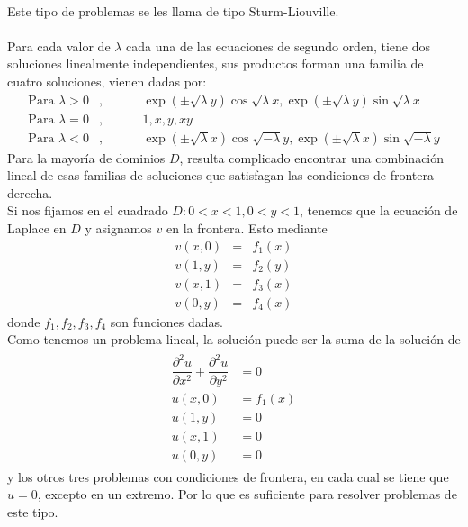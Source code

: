 \\
Este tipo de problemas se les llama de tipo Sturm-Liouville.
\\
\\
Para cada valor de $\lambda$ cada una de las ecuaciones de segundo orden, tiene dos soluciones linealmente independientes, sus productos forman una familia de cuatro soluciones, vienen dadas por:
\begin{eqnarray}
\text{Para } \lambda > 0 &,& \hspace{1cm} \exp(\pm\sqrt{\lambda} y) \cos \sqrt{\lambda} x, \exp(\pm \sqrt{\lambda} y) \sin \sqrt{\lambda} x \\
\text{Para } \lambda = 0 &,& \hspace{1cm} 1,x,y,xy \\
\text{Para } \lambda < 0 &,& \hspace{1cm} \exp(\pm\sqrt{\lambda} x) \cos \sqrt{- \lambda} y, \exp(\pm \sqrt{\lambda} x) \sin \sqrt{-\lambda} y 
\end{eqnarray}
Para la mayoría de dominios $D$, resulta complicado encontrar una combinación lineal de esas familias de soluciones que satisfagan las condiciones de frontera derecha.
\\
Si nos fijamos en el cuadrado $D: 0<x<1, 0<y<1$, tenemos que la ecuación de Laplace en $D$ y asignamos $v$ en la frontera. Esto mediante
\begin{eqnarray*}
v(x,0) &=& f_{1}(x) \\
v(1,y) &=& f_{2}(y) \\
v(x,1) &=& f_{3}(x) \\
v(0,y) &=& f_{4}(x) 
\end{eqnarray*}
donde $f_{1},f_{2},f_{3},f_{4}$ son funciones dadas.
\\
Como tenemos un problema lineal, la solución puede ser la suma de la solución de
\begin{eqnarray}
\begin{aligned}
\dfrac{\partial^{2} u}{\partial x^{2}} + \dfrac{\partial^{2} u}{\partial y^{2}} &= 0 \\
u(x,0) &= f_{1} (x) \\
u(1,y) &= 0 \\
u(x,1) &= 0 \\
u(0,y) &= 0 
\end{aligned}
\end{eqnarray}
y los otros tres problemas con condiciones de frontera, en cada cual se tiene que $u=0$, excepto en un extremo. Por lo que es suficiente para resolver problemas de este tipo.
\\
